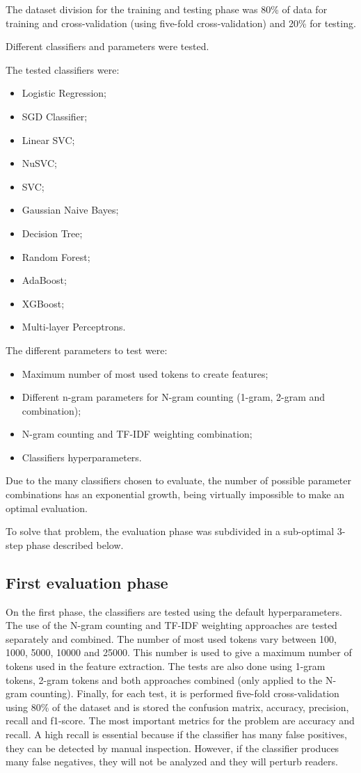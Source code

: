 \documentclass[journal]{IEEEtran}
\begin{document}
The dataset division for the training and testing phase was 80\% of data for training and cross-validation (using five-fold cross-validation) and 20\% for testing.

Different classifiers and parameters were tested.

The tested classifiers were:
\begin{itemize}
\item Logistic Regression;
\item SGD Classifier;
\item Linear SVC;
\item NuSVC;
\item SVC;
\item Gaussian Naive Bayes;
\item Decision Tree;
\item Random Forest;
\item AdaBoost;
\item XGBoost;
\item Multi-layer Perceptrons.
\end{itemize}

The different parameters to test were:
\begin{itemize}
\item Maximum number of most used tokens to create features;
\item Different n-gram parameters for N-gram counting (1-gram, 2-gram and combination);
\item N-gram counting and TF-IDF weighting combination;
\item Classifiers hyperparameters.
\end{itemize}

Due to the many classifiers chosen to evaluate, the number of possible parameter combinations has an exponential growth, being virtually impossible to make an optimal evaluation.

To solve that problem, the evaluation phase was subdivided in a sub-optimal 3-step phase described below.

\subsection{First evaluation phase}

On the first phase, the classifiers are tested using the default hyperparameters. The use of the N-gram counting and TF-IDF weighting approaches are tested separately and combined. The number of most used tokens vary between 100, 1000, 5000, 10000 and 25000. This number is used to give a maximum number of tokens used in the feature extraction. The tests are also done using 1-gram tokens, 2-gram tokens and both approaches combined (only applied to the N-gram counting).
Finally, for each test, it is performed five-fold cross-validation using 80\% of the dataset and is stored the confusion matrix, accuracy, precision, recall and f1-score. The most important metrics for the problem are accuracy and recall. A high recall is essential because if the classifier has many false positives, they can be detected by manual inspection. However, if the classifier produces many false negatives, they will not be analyzed and they will perturb readers.
\end{document}
